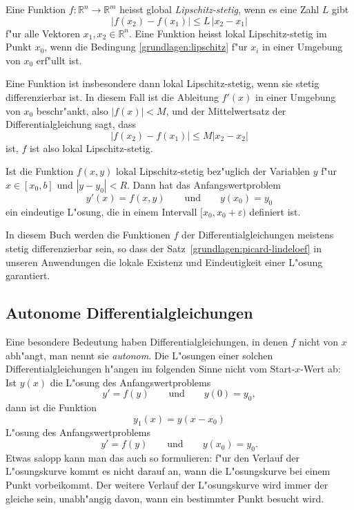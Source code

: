 \begin{definition}
Eine Funktion $f\colon \mathbb R^n\to\mathbb R^m$ heisst global
{\em Lipschitz-stetig},
%
wenn es eine Zahl $L$ gibt 
\begin{equation}
|f(x_2)-f(x_1)| \le L\,|x_2-x_1|
\label{grundlagen:lipschitz}
\end{equation}
f"ur alle Vektoren $x_1,x_2\in\mathbb R^n$.
Eine Funktion heisst lokal Lipschitz-stetig im Punkt $x_0$, wenn die
Bedingung \eqref{grundlagen:lipschitz} f"ur $x_i$ in einer Umgebung von
$x_0$ erf"ullt ist.
\end{definition}

Eine Funktion ist insbesondere dann lokal Lipschitz-stetig, wenn sie
stetig differenzierbar ist.
In diesem Fall ist die Ableitung $f'(x)$ in einer Umgebung von $x_0$
beschr"ankt, also $|f(x)|<M$, und der Mittelwertsatz der Differentialgleichung
sagt, dass
\[
|f(x_2)-f(x_1)|\le M |x_2-x_2|
\]
ist, $f$ ist also lokal Lipschitz-stetig.

\begin{satz}
\label{grundlagen:picard-lindeloef}
%
%
Ist die Funktion $f(x,y)$ lokal Lipschitz-stetig bez"uglich der Variablen
$y$ f"ur $x\in[x_0,b]$ und $|y-y_0|<R$.
Dann hat das Anfangswertproblem
\[
y'(x)=f(x,y)\qquad\text{und}\qquad y(x_0)=y_0
\]
ein eindeutige L"osung, die in einem Intervall $[x_0,x_0+\varepsilon)$
definiert ist.
\end{satz}
%
%

In diesem Buch werden die Funktionen $f$ der Differentialgleichungen 
meistens stetig differenzierbar sein, so dass der
Satz~\ref{grundlagen:picard-lindeloef} in unseren Anwendungen die lokale
Existenz und Eindeutigkeit einer L"osung garantiert.

\subsection{Autonome Differentialgleichungen}
Eine besondere Bedeutung haben Differentialgleichungen, in denen
$f$ nicht von $x$ abh"angt, man nennt sie {\em autonom}.
%
%
Die L"osungen einer solchen Differentialgleichungen h"angen im
folgenden Sinne nicht vom Start-$x$-Wert ab:
Ist $y(x)$ die L"osung des Anfangswertproblems
\[
y'=f(y)\qquad\text{und}\qquad y(0)=y_0,
\]
dann ist die Funktion
\[
y_1(x)=y(x-x_0)
\]
L"osung des Anfangswertproblems
\[
y'=f(y)\qquad\text{und}\qquad y(x_0)=y_0.
\]
Etwas salopp kann man das auch so formulieren: f"ur den Verlauf der 
L"osungskurve kommt es nicht darauf an, wann die L"osungskurve bei 
einem Punkt vorbeikommt.
Der weitere Verlauf der L"osungskurve wird immer der gleiche sein,
unabh"angig davon, wann ein bestimmter Punkt besucht wird.

